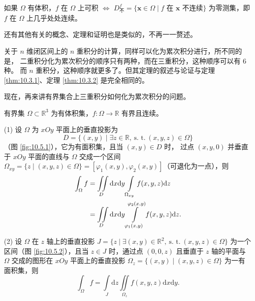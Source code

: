如果 $\Omega$ 有体积，$f$ 在 $\Omega$ 上可积 $\Leftrightarrow$
$D_{\text{不}}^{f} = \{\boldsymbol{x} \in \Omega \mid f \text{ 在 } \boldsymbol{x} \text{ 不连续}\}$
为零测集，即 $f$ 在 $\Omega$ 上几乎处处连续。

还有其他有关的概念、定理和证明也是类似的，不再一一赘述。

关于 $n$ 维闭区间上的 $n$ 重积分的计算，同样可以化为累次积分进行，所不同的是，
二重积分化为累次积分的顺序只有两种，而在三重积分，这种顺序可以有 6 种。
而 $n$ 重积分，这种顺序就更多了。但其定理的叙述与论证与定理 \ref{thm:10.3.1}、定理 \ref{thm:10.3.2} 是完全相同的。

现在，再来讲有界集合上三重积分如何化为累次积分的问题。
\begin{theorem}[三重积分化为累次积分]\label{thm:10.5.1}
有界集 $\Omega \subset \mathbb{R}^3$ 为有体积集，$f\colon \Omega \to \mathbb{R}$ 有界且连续。

(1) 设 $\Omega$ 为 $xOy$ 平面上的垂直投影为
\[
D = \{(x, y) \mid \exists z \in \mathbb{R},\ \text{s.\ t.}\ (x, y, z) \in \Omega\}
\]
（图 \ref{fig:10.5.1}），它为有面积集，且当 $(x, y) \in D$ 时，
过点 $(x, y, 0)$ 并垂直于 $xOy$ 平面的直线与 $\Omega$ 交成一个区间
$\Omega_{xy} = \{z \mid (x, y, z) \in \Omega\} = [\varphi_1(x, y), \varphi_2(x, y)]$（可退化为一点），则
\begin{align*}
\int_{\Omega} f
&= \iint \limits_{D} \mathrm{d}x \mathrm{d}y \int \limits_{\Omega_{xy}} f(x, y, z) \mathrm{d}z \notag\\
&= \iint \limits_{D} \mathrm{d}x \mathrm{d}y
   \int \limits_{\varphi_1(x, y)}^{\varphi_2(x, y)} f(x, y, z) \mathrm{d}z. \notag
\end{align*}

(2) 设 $\Omega$ 在 $z$ 轴上的垂直投影
$J = \{z \mid \exists (x, y) \in \mathbb{R}^2,\ \text{s.\ t.}\ (x, y, z) \in \Omega\}$
为一个区间（图 \ref{fig:10.5.2}），且当 $z \in J$ 时，通过点 $(0, 0, z)$ 且垂直于 $z$ 轴的平面与 $\Omega$ 交成的图形在 $xOy$
平面上的垂直投影 $\Omega_z = \{(x, y) \mid (x, y, z) \in \Omega\}$ 为一有面积集，则
\[
\int_{\Omega} f = \int \limits_{J} \mathrm{d}z \iint \limits_{\Omega_z} f(x, y, z) \mathrm{d}x \mathrm{d}y.
\]
\end{theorem}
